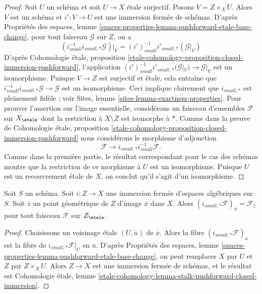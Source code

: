 \begin{proof}
Soit $U$ un schéma et soit $U \to X$ \'etale surjectif.
Posons $V = Z \times_X U$. Alors $V$ est un schéma et $i' : V \to U$ est
une immersion fermée de schémas. D'après
Propriétés des espaces,
lemme \ref{spaces-properties-lemma-pushforward-etale-base-change},
pour tout faisceau $\mathcal{G}$ sur $Z$, on a
$$
(i_{small}^{-1}i_{small, *}\mathcal{G})|_V =
(i')_{small}^{-1}i'_{small, *}(\mathcal{G}|_V)
$$
D'après
Cohomologie \'etale, proposition
\ref{etale-cohomology-proposition-closed-immersion-pushforward},
l'application
$(i')_{small}^{-1}i'_{small, *}(\mathcal{G}|_V) \to \mathcal{G}|_V$
est un isomorphisme. Puisque $V \to Z$ est surjectif et \'etale, cela entraîne
que $i_{small}^{-1}i_{small, *}\mathcal{G} \to \mathcal{G}$ est un
isomorphisme. Ceci implique clairement que $i_{small, *}$ est pleinement fidèle ; voir
Sites, lemme \ref{sites-lemma-exactness-properties}.
Pour prouver l'assertion sur l'image essentielle, considérons un faisceau d'ensembles
$\mathcal{F}$ sur $X_\etale$ dont la restriction à $X \setminus Z$ est
isomorphe à $*$. Comme dans la preuve de
Cohomologie \'etale, proposition
\ref{etale-cohomology-proposition-closed-immersion-pushforward}
nous considérons le morphisme d'adjonction
$$
\mathcal{F} \longrightarrow i_{small, *}i_{small}^{-1}\mathcal{F}.
$$
Comme dans la première partie, le résultat correspondant pour le cas des
schémas montre que la restriction de ce morphisme à $U$ est un isomorphisme.
Puisque $U$ est un recouvrement \'etale de $X$, on
conclut qu'il s'agit d'un isomorphisme.
\end{proof}

\begin{lemma}
\label{lemma-stalk-push-closed}
Soit $S$ un schéma. Soit $i : Z \to X$ une immersion fermée d'espaces
algébriques sur $S$. Soit $\overline{z}$ un point géométrique de $Z$
d'image $\overline{x}$ dans $X$. Alors
$(i_{small, *}\mathcal{F})_{\overline{x}} = \mathcal{F}_{\overline{z}}$
pour tout faisceau $\mathcal{F}$ sur $Z_\etale$.
\end{lemma}

\begin{proof}
Choisissons un voisinage \'etale $(U, \overline{u})$ de $\overline{x}$.
Alors la fibre $(i_{small, *}\mathcal{F})_{\overline{x}}$
est la fibre de $i_{small, *}\mathcal{F}|_U$ en $\overline{u}$.
D'après Propriétés des espaces,
lemme \ref{spaces-properties-lemma-pushforward-etale-base-change},
on peut remplacer $X$ par $U$ et $Z$ par $Z \times_X U$.
Alors $Z \to X$ est une immersion fermée de schémas, et le résultat est
Cohomologie \'etale, lemme
\ref{etale-cohomology-lemma-stalk-pushforward-closed-immersion}.
\end{proof}

